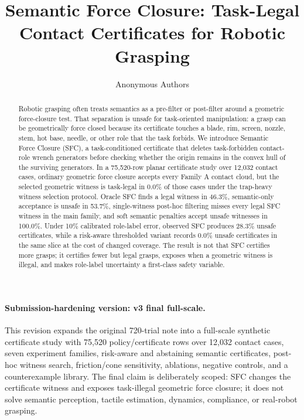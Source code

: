 \documentclass{article}
\title{Semantic Force Closure: Task-Legal Contact Certificates for Robotic Grasping}
\author{Anonymous Authors}
\begin{document}
\maketitle

\paragraph{Submission-hardening version: v3 final full-scale.}
This revision expands the original 720-trial note into a full-scale synthetic certificate study with 75,520 policy/certificate rows over 12,032 contact cases, seven experiment families, risk-aware and abstaining semantic certificates, post-hoc witness search, friction/cone sensitivity, ablations, negative controls, and a counterexample library. The final claim is deliberately scoped: SFC changes the certificate witness and exposes task-illegal geometric force closure; it does not solve semantic perception, tactile estimation, dynamics, compliance, or real-robot grasping.

\begin{abstract}
Robotic grasping often treats semantics as a pre-filter or post-filter around a geometric force-closure test. That separation is unsafe for task-oriented manipulation: a grasp can be geometrically force closed because its certificate touches a blade, rim, screen, nozzle, stem, hot base, needle, or other role that the task forbids. We introduce Semantic Force Closure (SFC), a task-conditioned certificate that deletes task-forbidden contact-role wrench generators before checking whether the origin remains in the convex hull of the surviving generators. In a 75,520-row planar certificate study over 12,032 contact cases, ordinary geometric force closure accepts every Family A contact cloud, but the selected geometric witness is task-legal in 0.0\% of those cases under the trap-heavy witness selection protocol. Oracle SFC finds a legal witness in 46.3\%, semantic-only acceptance is unsafe in 53.7\%, single-witness post-hoc filtering misses every legal SFC witness in the main family, and soft semantic penalties accept unsafe witnesses in 100.0\%. Under 10\% calibrated role-label error, observed SFC produces 28.3\% unsafe certificates, while a risk-aware thresholded variant records 0.0\% unsafe certificates in the same slice at the cost of changed coverage. The result is not that SFC certifies more grasps; it certifies fewer but legal grasps, exposes when a geometric witness is illegal, and makes role-label uncertainty a first-class safety variable.
\end{abstract}
\end{document}
